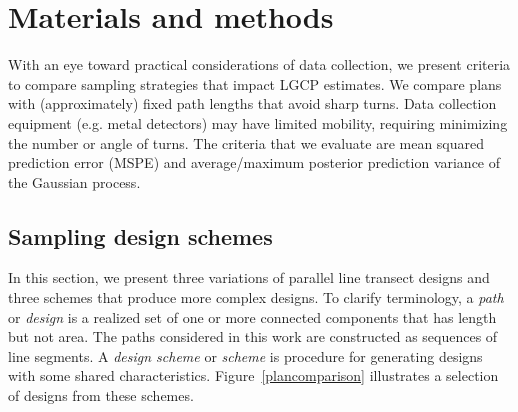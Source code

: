 \documentclass[review]{elsarticle}
\begin{document}


\section{Materials and methods}


With an eye toward practical considerations of data collection, we present
criteria to compare sampling strategies that impact LGCP estimates. We compare
plans with (approximately) fixed path lengths that avoid sharp turns. Data
collection equipment (e.g. metal detectors) may have limited mobility,
requiring minimizing the number or angle of turns. The criteria that we
evaluate are mean squared prediction error (MSPE) and average/maximum posterior
prediction variance of the Gaussian process.


\subsection{Sampling design schemes}
\label{methodschemes}

In this section, we present three variations of parallel line transect designs
and three schemes that produce more complex designs. To clarify terminology, a
\emph{path} or \emph{design} is a realized set of one or more connected
components that has length but not area. The paths considered in this work are
constructed as sequences of line segments. A \emph{design scheme} or
\emph{scheme} is procedure for generating designs with some shared
characteristics. Figure~\ref{plancomparison} illustrates a selection of designs
from these schemes.
\end{document}
